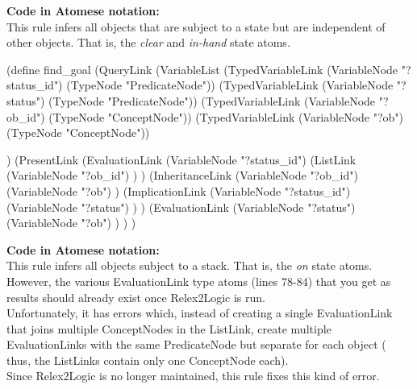 \begin{footnotesize}
\textbf{Code in Atomese notation:} \\
This rule infers all objects that are subject to a state but are independent of other objects. That is, the \textit{clear} and \textit{in-hand} state atoms.
\end{footnotesize}

\begin{python}
(define find_goal
  (QueryLink
    (VariableList
      (TypedVariableLink 
        (VariableNode "?status_id") 
        (TypeNode "PredicateNode"))
      (TypedVariableLink 
        (VariableNode "?status") 
        (TypeNode "PredicateNode"))
      (TypedVariableLink 
        (VariableNode "?ob_id") 
        (TypeNode "ConceptNode"))
      (TypedVariableLink 
        (VariableNode "?ob") 
        (TypeNode "ConceptNode"))
  
    )
    (PresentLink
      (EvaluationLink
        (VariableNode "?status_id")
        (ListLink
          (VariableNode "?ob_id")
        )
      )
      (InheritanceLink
        (VariableNode "?ob_id")
        (VariableNode "?ob")
      )
      (ImplicationLink
        (VariableNode "?status_id")
        (VariableNode "?status")
      )
    )
    (EvaluationLink
      (VariableNode "?status")
      (VariableNode "?ob")
    )
  )
)
\end{python}

\bigskip

\begin{footnotesize}
\textbf{Code in Atomese notation:} \\
This rule infers all objects subject to a stack. That is, the \textit{on} state atoms. \\
However, the various EvaluationLink type atoms (lines 78-84) that you get as results should already exist once Relex2Logic is run. \\
Unfortunately, it has errors which, instead of creating a single EvaluationLink that joins multiple ConceptNodes in the ListLink, create multiple EvaluationLinks with the same PredicateNode but separate for each object ( thus, the ListLinks contain only one ConceptNode each). \\
Since Relex2Logic is no longer maintained, this rule fixes this kind of error.
\end{footnotesize}

